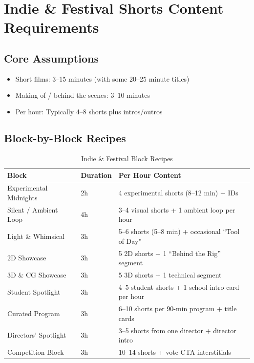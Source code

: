 \documentclass[12pt,letterpaper,twoside]{report}
\begin{document}
\section{Indie \& Festival Shorts Content Requirements}

\subsection{Core Assumptions}

\begin{itemize}[leftmargin=1.5cm]
    \item Short films: 3--15 minutes (with some 20--25 minute titles)
    \item Making-of / behind-the-scenes: 3--10 minutes
    \item Per hour: Typically 4--8 shorts plus intros/outros
\end{itemize}

\subsection{Block-by-Block Recipes}

\begin{table}[H]
\centering
\caption{Indie \& Festival Block Recipes}
\label{tab:indie-recipes}
\begin{tabular}{@{}L{4cm}L{2cm}L{7.5cm}@{}}
\toprule
\textbf{Block} & \textbf{Duration} & \textbf{Per Hour Content} \\
\midrule
Experimental Midnights & 2h & 4 experimental shorts (8--12 min) + IDs \\
Silent / Ambient Loop & 4h & 3--4 visual shorts + 1 ambient loop per hour \\
Light \& Whimsical & 3h & 5--6 shorts (5--8 min) + occasional ``Tool of Day'' \\
2D Showcase & 3h & 5 2D shorts + 1 ``Behind the Rig'' segment \\
3D \& CG Showcase & 3h & 5 3D shorts + 1 technical segment \\
Student Spotlight & 3h & 4--5 student shorts + 1 school intro card per hour \\
Curated Program & 3h & 6--10 shorts per 90-min program + title cards \\
Directors' Spotlight & 3h & 3--5 shorts from one director + director intro \\
Competition Block & 3h & 10--14 shorts + vote CTA interstitials \\
\bottomrule
\end{tabular}
\end{table}
\end{document}
